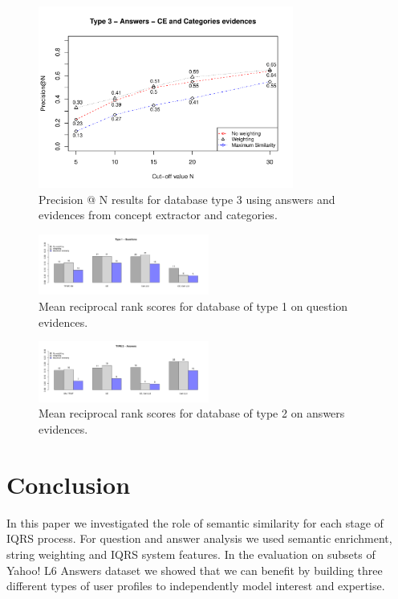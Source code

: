 \documentclass[conference]{IEEEtran}
\begin{document}
\begin{figure}[!t]
	\centering
	\includegraphics[width=3.3in]{type3answers_PAtN.pdf}
	\caption{Precision @ N results for database type 3 using answers and evidences from concept extractor and categories.}
	\label{fig:pntype3}
\end{figure}


\begin{figure}[!t]
	\centering
	\includegraphics[width=0.5\textwidth]{mrrType1Questions.pdf}
	\caption{Mean reciprocal rank scores for database of type 1 on question evidences.}
	\label{fig:mrrtype1}
\end{figure}

\begin{figure}[!t]
	\centering
	\includegraphics[width=0.5\textwidth]{mrrType2Answers.pdf}
	\caption{Mean reciprocal rank scores for database of type 2 on answers evidences.}
	\label{fig:mrrtype2}
\end{figure}


\section{Conclusion}
\label{sec:conclusion}
In this paper we investigated the role of semantic similarity for each stage of IQRS process. For question and answer analysis we used semantic enrichment, string weighting and IQRS system features. In the evaluation on subsets of Yahoo! L6 Answers dataset we showed that we can benefit by building three different types of user profiles to independently model interest and expertise.
\end{document}
